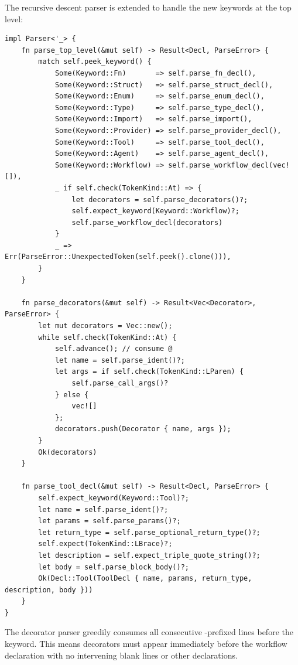 The recursive descent parser is extended to handle the new keywords at the top level:

\begin{lstlisting}[language={}]
impl Parser<'_> {
    fn parse_top_level(&mut self) -> Result<Decl, ParseError> {
        match self.peek_keyword() {
            Some(Keyword::Fn)       => self.parse_fn_decl(),
            Some(Keyword::Struct)   => self.parse_struct_decl(),
            Some(Keyword::Enum)     => self.parse_enum_decl(),
            Some(Keyword::Type)     => self.parse_type_decl(),
            Some(Keyword::Import)   => self.parse_import(),
            Some(Keyword::Provider) => self.parse_provider_decl(),
            Some(Keyword::Tool)     => self.parse_tool_decl(),
            Some(Keyword::Agent)    => self.parse_agent_decl(),
            Some(Keyword::Workflow) => self.parse_workflow_decl(vec![]),
            _ if self.check(TokenKind::At) => {
                let decorators = self.parse_decorators()?;
                self.expect_keyword(Keyword::Workflow)?;
                self.parse_workflow_decl(decorators)
            }
            _ => Err(ParseError::UnexpectedToken(self.peek().clone())),
        }
    }

    fn parse_decorators(&mut self) -> Result<Vec<Decorator>, ParseError> {
        let mut decorators = Vec::new();
        while self.check(TokenKind::At) {
            self.advance(); // consume @
            let name = self.parse_ident()?;
            let args = if self.check(TokenKind::LParen) {
                self.parse_call_args()?
            } else {
                vec![]
            };
            decorators.push(Decorator { name, args });
        }
        Ok(decorators)
    }

    fn parse_tool_decl(&mut self) -> Result<Decl, ParseError> {
        self.expect_keyword(Keyword::Tool)?;
        let name = self.parse_ident()?;
        let params = self.parse_params()?;
        let return_type = self.parse_optional_return_type()?;
        self.expect(TokenKind::LBrace)?;
        let description = self.expect_triple_quote_string()?;
        let body = self.parse_block_body()?;
        Ok(Decl::Tool(ToolDecl { name, params, return_type, description, body }))
    }
}
\end{lstlisting}

\begin{implementation}
The decorator parser greedily consumes all consecutive -prefixed lines before the  keyword. This means decorators must appear immediately before the workflow declaration with no intervening blank lines or other declarations.
\end{implementation}

